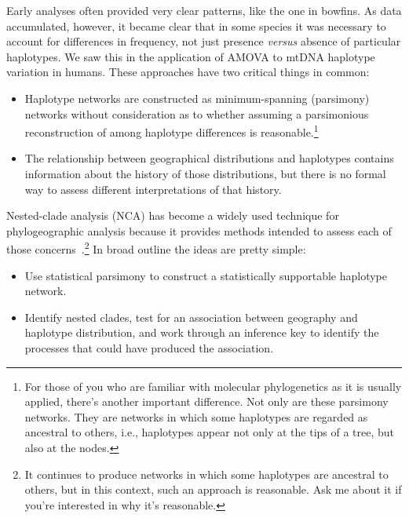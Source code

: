 Early analyses often provided very clear patterns, like the one in
bowfins. As data accumulated, however, it became clear that in some
species it was necessary to account for differences in frequency, not
just presence {\it versus\/} absence of particular haplotypes. We saw
this in the application of AMOVA to mtDNA haplotype variation in
humans. These approaches have two critical things in common:

\begin{itemize}

\item Haplotype networks are constructed as minimum-spanning
  (parsimony) networks without consideration as to whether assuming a
  parsimonious reconstruction of among haplotype differences is
  reasonable.\footnote{For those of you who are familiar with
    molecular phylogenetics as it is usually applied, there's another
    important difference. Not only are these parsimony networks. They
    are networks in which some haplotypes are regarded as ancestral to
    others, i.e., haplotypes appear not only at the tips of a tree,
    but also at the nodes.}

\item The relationship between geographical distributions and
  haplotypes contains information about the history of those
  distributions, but there is no formal way to assess different
  interpretations of that history.

\end{itemize}

Nested-clade analysis (NCA) has become a widely used technique for
phylogeographic analysis because it provides methods intended to
assess each of those concerns~\cite{Templeton-2004}.\footnote{It
  continues to produce networks in which some haplotypes are ancestral
  to others, but in this context, such an approach is reasonable. Ask
  me about it if you're interested in why it's reasonable.} In broad
outline the ideas are pretty simple:

\begin{itemize}

\item Use statistical parsimony to construct a statistically
  supportable haplotype network.

\item Identify nested clades, test for an association between
  geography and haplotype distribution, and work through an inference
  key to identify the processes that could have produced the
  association.

\end{itemize}

